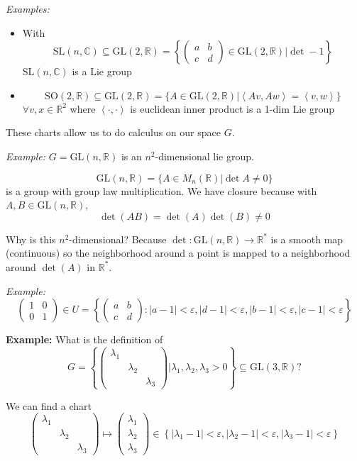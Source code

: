 \documentclass[12pt]{article}
\newcommand{\R}{\mathbb{R}}
\newcommand{\C}{\mathbb{C}}
\newcommand{\brak}[1]{\left\langle #1 \right\rangle}
\newcommand{\abs}[1]{\left\vert #1 \right\vert}
\newcommand{\SL}{\text{SL}}
\newcommand{\SO}{\text{SO}}
\newcommand{\GL}{\text{GL}}
\begin{document}
    \emph{Examples:}
    \begin{itemize}
        \item With 
        \[\SL(n, \C) \subseteq \GL(2, \R) = \left\{\begin{pmatrix}
            a & b\\ 
            c & d
        \end{pmatrix} \in \GL(2, \R) \bigg\vert \det -1\right\}\] 
        $\SL(n, \C)$ is a Lie group 

        \item 
        \[\SO(2, \R) \subseteq \GL(2, \R) = \{A \in \GL(2, \R) \big\vert \brak{Av, Aw} = \brak{v, w}\}\] $\forall v, x \in \R^2$ where $\brak{\cdot, \cdot}$ is euclidean inner product is a 1-dim Lie group 
    \end{itemize}

    These charts allow us to do calculus on our space $G$. 

    \emph{Example:} $G = \GL(n, \R)$ is an $n^2$-dimensional lie group. 
    
    \[\GL(n, \R) = \{A \in M_n(\R) \big\vert \det A \neq 0\}\]
    is a group with group law multiplication. We have closure because with $A, B \in \GL(n, \R)$, 
    \[\det(AB) = \det(A) \det(B) \neq 0\] 
    
    Why is this $n^2$-dimensional? Because $\det: \GL(n, \R) \to \R^*$ is a smooth map (continuous) so the neighborhood around a point is mapped to a neighborhood around $\det(A)$ in $\R^*$. 

    \emph{Example:} 
    \[\begin{pmatrix}
        1 & 0\\ 
        0 & 1
    \end{pmatrix} \in U = \left\{\begin{pmatrix}
        a & b\\ 
        c & d
    \end{pmatrix}: \abs{a - 1} < \varepsilon, \abs{d - 1} < \varepsilon, \abs{b - 1} < \varepsilon, \abs{c - 1} < \varepsilon\right\}\]

    \textbf{Example:} What is the definition of 
    \[G = \left\{\begin{pmatrix}
        \lambda_1\\ 
        & \lambda_2\\
        & & \lambda_3
    \end{pmatrix} \bigg\vert \lambda_1, \lambda_2, \lambda_3 > 0\right\} \subseteq \GL(3, \R)?\] 

    We can find a chart 
    \[\begin{pmatrix}
        \lambda_1\\ 
        & \lambda_2\\
        & & \lambda_3
    \end{pmatrix} \mapsto \begin{pmatrix}
        \lambda_1\\ 
        \lambda_2\\
        \lambda_3
    \end{pmatrix} \in \left\{\abs{\lambda_1 - 1} < \varepsilon, \abs{\lambda_2 - 1} < \varepsilon, \abs{\lambda_3 - 1} < \varepsilon\right\}\]
\end{document}
